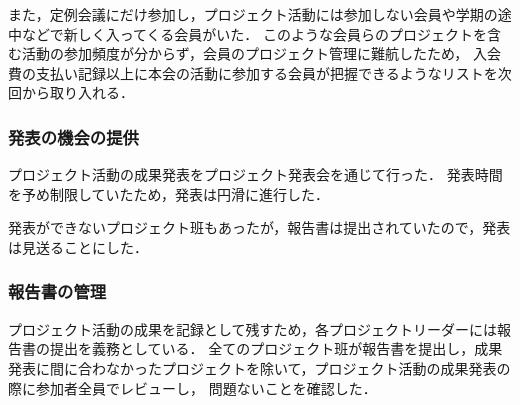また，定例会議にだけ参加し，プロジェクト活動には参加しない会員や学期の途中などで新しく入ってくる会員がいた．
このような会員らのプロジェクトを含む活動の参加頻度が分からず，会員のプロジェクト管理に難航したため，
入会費の支払い記録以上に本会の活動に参加する会員が把握できるようなリストを次回から取り入れる．

\subsubsection*{発表の機会の提供}

プロジェクト活動の成果発表をプロジェクト発表会を通じて行った．
発表時間を予め制限していたため，発表は円滑に進行した．

発表ができないプロジェクト班もあったが，報告書は提出されていたので，発表は見送ることにした．

\subsubsection*{報告書の管理}

プロジェクト活動の成果を記録として残すため，各プロジェクトリーダーには報告書の提出を義務としている．
全てのプロジェクト班が報告書を提出し，成果発表に間に合わなかったプロジェクトを除いて，プロジェクト活動の成果発表の際に参加者全員でレビューし，
問題ないことを確認した．
